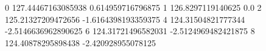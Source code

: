0 127.44467163085938 0.614959716796875
1 126.8297119140625 0.0
2 125.21327209472656 -1.6164398193359375
4 124.31504821777344 -2.5146636962890625
6 124.31721496582031 -2.5124969482421875
8 124.40878295898438 -2.420928955078125
